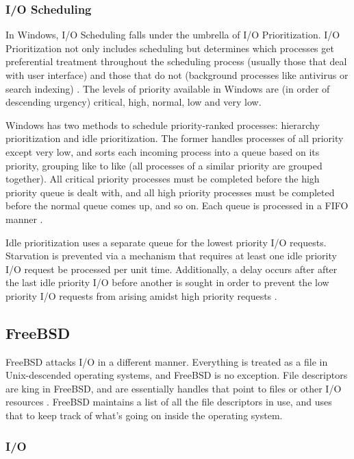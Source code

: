 \documentclass[10pt,draftclsnofoot,onecolumn,compsoc]{IEEEtran}
\begin{document}
	\subsubsection{I/O Scheduling}
	
	In Windows, I/O Scheduling falls under the umbrella of I/O Prioritization. I/O Prioritization not only includes scheduling but determines which processes get preferential treatment throughout the scheduling process (usually those that deal with user interface) and those that do not (background processes like antivirus or search indexing) \cite{WInternals}. The levels of priority available in Windows are (in order of descending urgency) critical, high, normal, low and very low.
	
	Windows has two methods to schedule priority-ranked processes: hierarchy prioritization and idle prioritization. The former handles processes of all priority except very low, and sorts each incoming process into a queue based on its priority, grouping like to like (all processes of a similar priority are grouped together). All critical priority processes must be completed before the high priority queue is dealt with, and all high priority processes must be completed before the normal queue comes up, and so on. Each queue is processed in a FIFO manner \cite{WInternals}.
	
	Idle prioritization uses a separate queue for the lowest priority I/O requests. Starvation is prevented via a mechanism that requires at least one idle priority I/O request be processed per unit time. Additionally, a delay occurs after after the last idle priority I/O before another is sought in order to prevent the low priority I/O requests from arising amidst high priority requests \cite{WInternals}.
	
	\subsection{FreeBSD}
	
	FreeBSD attacks I/O in a different manner. Everything is treated as a file in Unix\texttrademark-descended operating systems, and FreeBSD is no exception. File descriptors are king in FreeBSD, and are essentially handles that point to files or other I/O resources \cite{BSD}. FreeBSD maintains a list of all the file descriptors in use, and uses that to keep track of what's going on inside the operating system. 
	
	\subsubsection{I/O}
	
\end{document}

